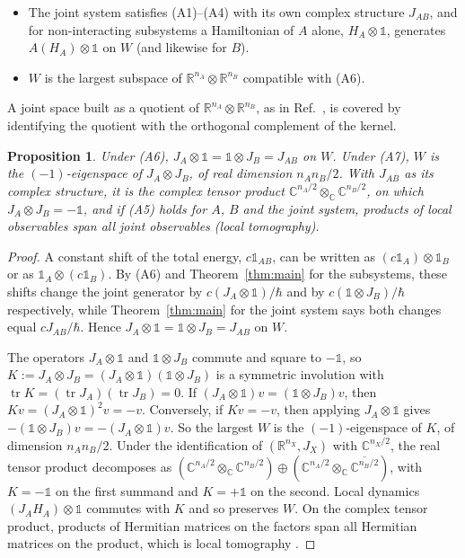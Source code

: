 \documentclass[11pt]{article}
\newtheorem{proposition}[theorem]{Proposition}
\theoremstyle{remark}
\newcommand{\R}{\mathbb{R}}
\newcommand{\C}{\mathbb{C}}
\newcommand{\one}{\mathbb{1}}
\newcommand{\tr}{\operatorname{tr}}
\begin{document}
\begin{itemize}
\item[(A6)] The joint system satisfies (A1)--(A4) with its own complex structure $J_{AB}$, and for non-interacting subsystems a Hamiltonian of $A$ alone, $H_A\otimes\one$, generates $A(H_A)\otimes\one$ on $W$ (and likewise for $B$).
\item[(A7)] $W$ is the largest subspace of $\R^{n_A}\otimes\R^{n_B}$ compatible with (A6).
\end{itemize}
A joint space built as a quotient of $\R^{n_A}\otimes\R^{n_B}$, as in Ref.~\cite{BarriosHita}, is covered by identifying the quotient with the orthogonal complement of the kernel.

\begin{proposition}\label{prop:composite}
Under (A6), $J_A\otimes\one=\one\otimes J_B=J_{AB}$ on $W$. Under (A7), $W$ is the $(-1)$-eigenspace of $J_A\otimes J_B$, of real dimension $n_An_B/2$. With $J_{AB}$ as its complex structure, it is the complex tensor product $\C^{n_A/2}\otimes_{\C}\C^{n_B/2}$, on which $J_A\otimes J_B=-\one$, and if (A5) holds for $A$, $B$ and the joint system, products of local observables span all joint observables (local tomography).
\end{proposition}

\begin{proof}
A constant shift of the total energy, $c\one_{AB}$, can be written as $(c\one_A)\otimes\one_B$ or as $\one_A\otimes(c\one_B)$. By (A6) and Theorem~\ref{thm:main} for the subsystems, these shifts change the joint generator by $c(J_A\otimes\one)/\hbar$ and by $c(\one\otimes J_B)/\hbar$ respectively, while Theorem~\ref{thm:main} for the joint system says both changes equal $cJ_{AB}/\hbar$. Hence $J_A\otimes\one=\one\otimes J_B=J_{AB}$ on $W$.

The operators $J_A\otimes\one$ and $\one\otimes J_B$ commute and square to $-\one$, so $K:=J_A\otimes J_B=(J_A\otimes\one)(\one\otimes J_B)$ is a symmetric involution with $\tr K=(\tr J_A)(\tr J_B)=0$. If $(J_A\otimes\one)v=(\one\otimes J_B)v$, then $Kv=(J_A\otimes\one)^2v=-v$. Conversely, if $Kv=-v$, then applying $J_A\otimes\one$ gives $-(\one\otimes J_B)v=-(J_A\otimes\one)v$. So the largest $W$ is the $(-1)$-eigenspace of $K$, of dimension $n_An_B/2$. Under the identification of $(\R^{n_X},J_X)$ with $\C^{n_X/2}$, the real tensor product decomposes as $(\C^{n_A/2}\otimes_\C\C^{n_B/2})\oplus(\C^{n_A/2}\otimes_\C\overline{\C^{n_B/2}})$, with $K=-\one$ on the first summand and $K=+\one$ on the second. Local dynamics $(J_AH_A)\otimes\one$ commutes with $K$ and so preserves $W$. On the complex tensor product, products of Hermitian matrices on the factors span all Hermitian matrices on the product, which is local tomography \cite{Hardy,MasanesMuller}.
\end{proof}
\end{document}
